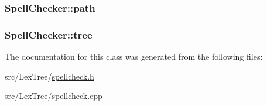\hypertarget{class_spell_checker_aff173fdb5d93d05cd3c130f8a5267272}{
\subsubsection[{path}]{ Spell\+Checker\+::path\hspace{0.3cm}{\ttfamily [private]}}}\label{class_spell_checker_aff173fdb5d93d05cd3c130f8a5267272}
\hypertarget{class_spell_checker_abe9e58ca9de98d9a1182612a3c10a5aa}{
\subsubsection[{tree}]{ Spell\+Checker\+::tree\hspace{0.3cm}{\ttfamily [private]}}}\label{class_spell_checker_abe9e58ca9de98d9a1182612a3c10a5aa}


The documentation for this class was generated from the following files\+:\begin{DoxyCompactItemize}
\item 
src/\+Lex\+Tree/\hyperlink{spellcheck_8h}{spellcheck.\+h}\item 
src/\+Lex\+Tree/\hyperlink{spellcheck_8cpp}{spellcheck.\+cpp}\end{DoxyCompactItemize}
